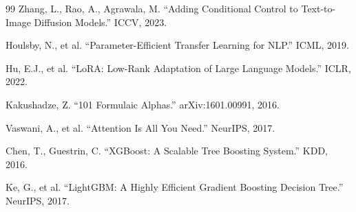 \documentclass[12pt,a4paper]{ctexart}
\numberwithin{figure}{section}
\numberwithin{table}{section}
\begin{document}
\begin{thebibliography}{99}
Zhang, L., Rao, A., Agrawala, M. ``Adding Conditional Control to Text-to-Image Diffusion Models.'' ICCV, 2023.

Houlsby, N., et al. ``Parameter-Efficient Transfer Learning for NLP.'' ICML, 2019.

Hu, E.J., et al. ``LoRA: Low-Rank Adaptation of Large Language Models.'' ICLR, 2022.

Kakushadze, Z. ``101 Formulaic Alphas.'' arXiv:1601.00991, 2016.

Vaswani, A., et al. ``Attention Is All You Need.'' NeurIPS, 2017.

Chen, T., Guestrin, C. ``XGBoost: A Scalable Tree Boosting System.'' KDD, 2016.

Ke, G., et al. ``LightGBM: A Highly Efficient Gradient Boosting Decision Tree.'' NeurIPS, 2017.

\end{thebibliography}


\end{document}
